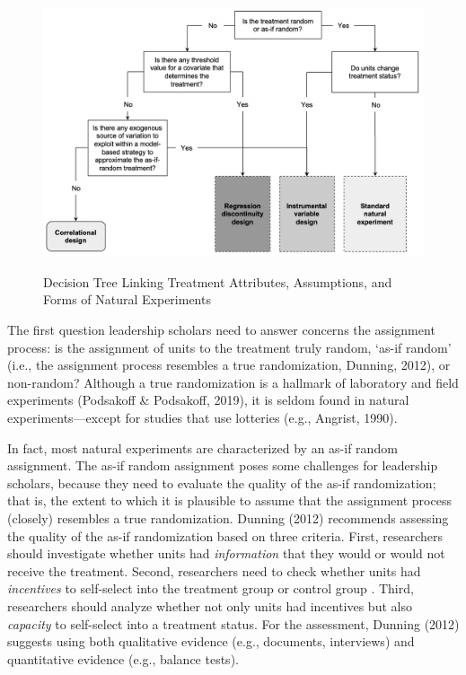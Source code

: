 \documentclass[english]{article}
\begin{document}
\begin{figure}[!htbpp]
	\centering
	\caption{Decision Tree Linking Treatment Attributes, Assumptions, and
	Forms of Natural Experiments}
	\includegraphics[width=1\textwidth]{_7}
	\label{fig:decision_tree}
\end{figure}

The first question leadership scholars need to answer concerns the
assignment process: is the assignment of units to the treatment truly
random, `as-if random' (i.e., the assignment process resembles a true
randomization, Dunning, 2012), or non-random? Although a true
randomization is a hallmark of laboratory and field experiments
(Podsakoff \& Podsakoff, 2019), it is seldom found in natural
experiments---except for studies that use lotteries (e.g., Angrist,
1990).

In fact, most natural experiments are characterized by an as-if random
assignment. The as-if random assignment poses some challenges for
leadership scholars, because they need to evaluate the quality of the
as-if randomization; that is, the extent to which it is plausible to
assume that the assignment process (closely) resembles a true
randomization. Dunning (2012) recommends assessing the quality of the
as-if randomization based on three criteria. First, researchers should
investigate whether units had \emph{information} that they would or
would not receive the treatment. Second, researchers need to check
whether units had \emph{incentives} to self-select into the treatment
group or control group . Third, researchers should analyze whether not
only units had incentives but also \emph{capacity} to self-select into a
treatment status. For the assessment, Dunning (2012) suggests using both
qualitative evidence (e.g., documents, interviews) and quantitative
evidence (e.g., balance tests).
\end{document}

